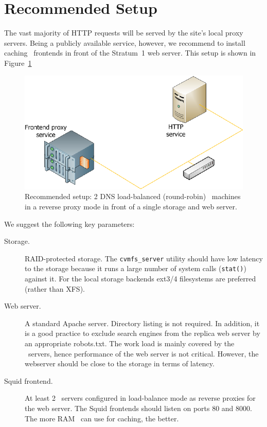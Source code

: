 \section{Recommended Setup}
The vast majority of HTTP requests will be served by the site's local proxy servers.
Being a publicly available service, however, we recommend to install caching \squid\ frontends in front of the Stratum~1 web server.
This setup is shown in Figure~\ref{fig:stratum1front}

\begin{figure}
	\centering
	\includegraphics{figures/stratum1front}
	\caption{Recommended setup: 2 DNS load-balanced (round-robin) \squid\ machines in a reverse proxy mode in front of a single storage and web server.}
	\label{fig:stratum1front}
\end{figure}

We suggest the following key parameters:
\begin{description}
	\item[Storage.] 
		RAID-protected storage.
		The \texttt{cvmfs\_server} utility should have low latency to the storage because it runs a large number of system calls (\texttt{stat()}) against it.
		For the local storage backends ext3/4 filesystems are preferred (rather than XFS).
	\item[Web server.]
		A standard Apache server.
		Directory listing is not required.
		In addition, it is a good practice to exclude search engines from the replica web server by an appropriate robots.txt.
		The work load is mainly covered by the \squid\ servers, hence performance of the web server is not critical.
		However, the webserver should be close to the storage in terms of latency.
	\item[Squid frontend.]
		At least 2 \squid\ servers configured in load-balance mode as reverse proxies for the web server.
		The Squid frontends should listen on ports 80 and 8000.
		The more RAM \squid\ can use for caching, the better.
\end{description}

